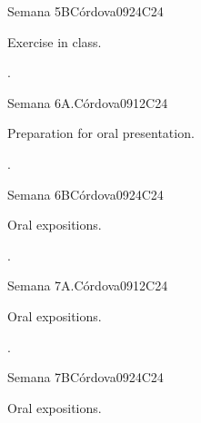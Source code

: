 \begin{syllabus}
\begin{unit}{Semana 5B}{}{Córdova09}{24}{C24}
   \begin{topics}
      \item Exercise in class.
   \end{topics}

   \begin{learningoutcomes}
      \item . 
      \end{learningoutcomes}
\end{unit}

\begin{unit}{Semana 6A.}{}{Córdova09}{12}{C24}
   \begin{topics}
      \item Preparation for oral presentation. 
   \end{topics}
   \begin{learningoutcomes}
      \item .
   \end{learningoutcomes}
\end{unit}

\begin{unit}{Semana 6B}{}{Córdova09}{24}{C24}
   \begin{topics}
      \item Oral expositions.
   \end{topics}

   \begin{learningoutcomes}
      \item .
      \end{learningoutcomes}
\end{unit}


\begin{unit}{Semana 7A.}{}{Córdova09}{12}{C24}
   \begin{topics}
      \item Oral expositions.
   \end{topics}
   \begin{learningoutcomes}
      \item .
   \end{learningoutcomes}
\end{unit}

\begin{unit}{Semana 7B}{}{Córdova09}{24}{C24}
   \begin{topics}
      \item Oral expositions.
   \end{topics}


\end{unit}
\end{syllabus}

